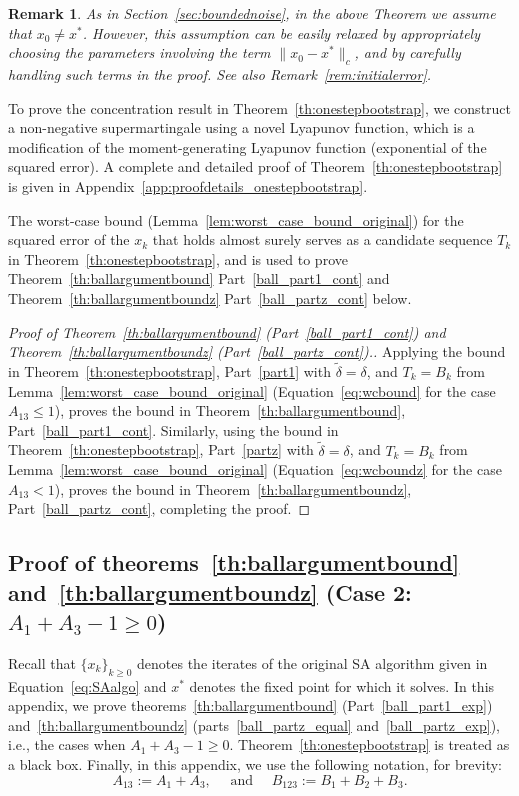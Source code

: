 \documentclass{article}
\newcommand{\xk}{x_k}
\newtheorem{remark}{Remark}
\begin{document}
\begin{remark}
    As in Section~\ref{sec:boundednoise}, in the above Theorem we assume that $x_0 \ne x^*$. However, this assumption can be easily relaxed by appropriately choosing the parameters involving the term $\|x_0 - x^*\|_c$, and by carefully handling such terms in the proof. See also Remark~\ref{rem:initialerror}.
\end{remark}
To prove the concentration result in Theorem~\ref{th:onestepbootstrap}, we construct a non-negative supermartingale using a novel Lyapunov function, which is a modification of the moment-generating Lyapunov function (exponential of the squared error). A complete and detailed proof of Theorem~\ref{th:onestepbootstrap} is given in Appendix~\ref{app:proofdetails_onestepbootstrap}. 

The worst-case bound (Lemma~\ref{lem:worst_case_bound_original}) for the squared error of the $x_k$ that holds almost surely serves as a candidate sequence $T_k$ in Theorem~\ref{th:onestepbootstrap}, and is used to prove Theorem~\ref{th:ballargumentbound} Part~\ref{ball_part1_cont} and Theorem~\ref{th:ballargumentboundz} Part~\ref{ball_partz_cont} below.

\begin{proof}[Proof of Theorem~\ref{th:ballargumentbound} (Part~\ref{ball_part1_cont}) and Theorem~\ref{th:ballargumentboundz} (Part~\ref{ball_partz_cont}).]
Applying the bound in Theorem~\ref{th:onestepbootstrap}, Part~\ref{part1} with $\tilde{\delta} = \delta$, and $T_k = B_k$ from Lemma~\ref{lem:worst_case_bound_original} (Equation~\eqref{eq:wcbound} for the case $A_{13} \le 1$), proves the bound in Theorem~\ref{th:ballargumentbound}, Part~\ref{ball_part1_cont}. Similarly,  using the bound in Theorem~\ref{th:onestepbootstrap}, Part~\ref{partz} with $\tilde{\delta} = \delta$, and $T_k = B_k$ from Lemma~\ref{lem:worst_case_bound_original} (Equation~\eqref{eq:wcboundz} for the case $A_{13} < 1$), proves the bound in Theorem~\ref{th:ballargumentboundz}, Part~\ref{ball_partz_cont}, completing the proof.
\end{proof}





\subsection{Proof of theorems~\ref{th:ballargumentbound} and~\ref{th:ballargumentboundz} (Case 2: $A_1 + A_3 - 1 \ge 0$)}\label{app:proofs:sec:boundednoise}
Recall that $\{\xk\}_{k\ge 0}$ denotes the iterates of the original SA algorithm given in Equation~\eqref{eq:SAalgo} and $x^*$ denotes the fixed point for which it solves. In this appendix, we prove theorems~\ref{th:ballargumentbound} (Part~\ref{ball_part1_exp}) and~\ref{th:ballargumentboundz} (parts~\ref{ball_partz_equal} and~\ref{ball_partz_exp}), i.e., the cases when $A_1 + A_3 - 1 \ge 0$. Theorem~\ref{th:onestepbootstrap} is treated as a black box. Finally, in this appendix, we use the following notation, for brevity:  
\[ A_{13} := A_1 + A_3, \quad \text{ and } \quad B_{123} := B_1 + B_2 + B_3. \]
\end{document}
